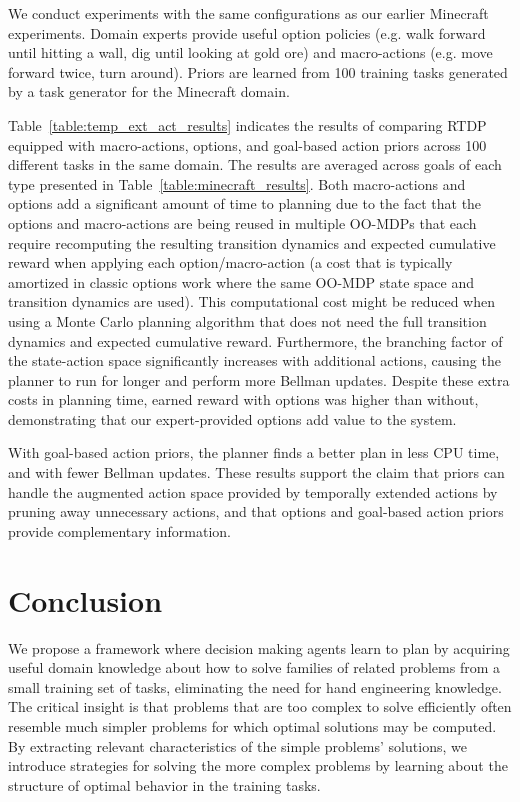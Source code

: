 \documentclass[11pt]{article}
\begin{document}
We conduct experiments with the same configurations as our earlier Minecraft experiments. Domain experts provide
useful option policies (e.g. walk forward until hitting a wall, dig until looking at gold ore) and macro-actions (e.g. move forward twice, turn around). Priors are learned from 100 training tasks generated by a task generator for the Minecraft domain.

Table~\ref{table:temp_ext_act_results} indicates the results of
comparing RTDP equipped with macro-actions, options, and goal-based action priors
across 100 different tasks in the same domain. The results are averaged across goals of each type
presented in Table~\ref{table:minecraft_results}. Both macro-actions
and options add a significant amount of time to planning due to the
fact that the options and macro-actions are being reused in
multiple OO-MDPs that each require recomputing the resulting transition
dynamics and expected cumulative reward when applying each
option/macro-action (a cost that is typically amortized in classic
options work where the same OO-MDP state space and transition dynamics
are used). This computational cost might be reduced when using a Monte
Carlo planning algorithm that does not need the full transition
dynamics and expected cumulative reward.  Furthermore, the branching
factor of the state-action space significantly increases with
additional actions, causing the planner to run for longer and perform
more Bellman updates.  Despite these extra costs in planning time,
earned reward with options was higher than without, demonstrating that
our expert-provided options add value to the system.

With goal-based action priors, the planner finds a better plan in less CPU time,
and with fewer Bellman updates. These results support the claim that
priors can handle the augmented action space provided by
temporally extended actions by pruning away unnecessary actions, and
that options and goal-based action priors provide complementary information.

\section{Conclusion}

We propose a framework where decision making agents learn to plan by acquiring useful domain knowledge about how to solve families of related problems from a small training set of tasks, eliminating the need for hand engineering knowledge. The critical insight is that problems that are too complex to solve efficiently often resemble much simpler problems for which optimal solutions may be computed. By extracting relevant characteristics of the simple problems' solutions, we introduce strategies for solving the more complex problems by learning about the structure of optimal behavior in the training tasks.
\end{document}
